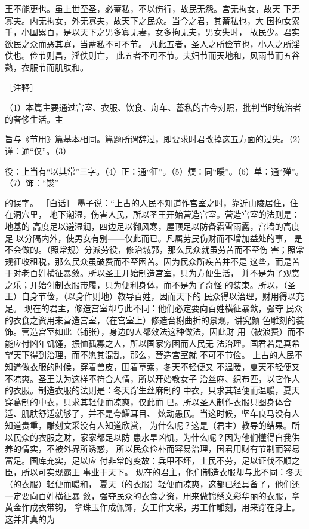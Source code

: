 \documentclass[12pt,UTF8]{ctexbook}
\begin{document}
王不能更也。虽上世至圣，必蓄私，不以伤行，故民无怨。宫无拘女，故天 
下无寡夫。内无拘女，外无寡夫，故天下之民众。当今之君，其蓄私也，大 
国拘女累千，小国累百，是以天下之男多寡无妻，女多拘无夫，男女失时， 
故民少。君实欲民之众而恶其寡，当蓄私不可不节。 
凡此五者，圣人之所俭节也，小人之所淫佚也。俭节则昌，淫佚则亡， 
此五者不可不节。夫妇节而天地和，风雨节而五谷熟，衣服节而肌肤和。 


［注释］ 

（1）本篇主要通过宫室、衣服、饮食、舟车、蓄私的古今对照，批判当时统治者的奢侈生活。主 

旨与《节用》篇基本相同。篇题所谓辞过，即要求时君改掉这五方面的过失。（2）谨：通“仅”。（3） 

役：上当有“以其常”三字。（4）正：通“征”。（5）煗：同“暖”。（6）单：通“殚”。（7）饰：“馂” 

的误字。 
［白话］ 
墨子说：“上古的人民不知道作宫室之时，靠近山陵居住，住在洞穴里， 
地下潮湿，伤害人民，所以圣王开始营造宫室。营造宫室的法则是：地基的 
高度足以避湿润，四边足以御风寒，屋顶足以防备霜雪雨露，宫墙的高度足 
以分隔内外，使男女有别——仅此而已。凡属劳民伤财而不增加益处的事， 
是不会做的。（照常规）分派劳役，修治城郭，那么民众就虽劳苦而不至伤 
害；照常规征收租税，那么民众虽破费而不至困苦。因为民众所疾苦并不是 
这些，而是苦于对老百姓横征暴敛。所以圣王开始制造宫室，只为方便生活， 
并不是为了观赏之乐；开始创制衣服带履，只为便利身体，而不是为了奇怪 
的装束。所以，（圣王）自身节俭，（以身作则地）教导百姓，因而天下的 
民众得以治理，财用得以充足。 
现在的君主，修造宫室却与此不同：他们必定要向百姓横征暴敛，强夺 
民众的衣食之资用来营造宫室，（在宫室上）修造台榭曲折的景观，讲究颜 
色雕刻的装饰。营造宫室如此（铺张），身边的人都效法这种做法，因此财 
用（被浪费）而不能应付凶年饥馑，振恤孤寡之人，所以国家穷困而人民无 
法治理。国君若是真希望天下得到治理，而不愿其混乱，那么，营造宫室就 
不可不节俭。 
上古的人民不知道做衣服的时候，穿着兽皮，围着草索，冬天不轻便又 
不温暖，夏天不轻便又不凉爽。圣王认为这样不符合人情，所以开始教女子 
治丝麻、织布匹，以它作人的衣服。制造衣服的法则是：冬天穿生丝麻制的 
中衣，只求其轻便而温暖，夏天穿葛制的中衣，只求其轻便而凉爽，仅此而 
已。所以圣人制作衣服只图身体合适、肌肤舒适就够了，并不是夸耀耳目、 
炫动愚民。当这时候，坚车良马没有人知道贵重，雕刻文采没有人知道欣赏， 
为什么呢？这是（君主）教导的结果。所以民众的衣服之财，家家都足以防 
患水旱凶饥，为什么呢？因为他们懂得自我供养的情实，不被外界所诱惑， 
所以民众俭朴而容易治理，国君用财有节制而容易富足。国库充实，足以应 
付非常的变故：兵甲不坏，士民不劳，足以证伐不顺之臣，所以可实现霸王 
事业于天下。 
现在的君主，他们制造衣服却与此不同：冬天（的衣服）轻便而暖和， 
夏天（的衣服）轻便而凉爽，这都已经具备了，他们还一定要向百姓横征暴 
敛，强夺民众的衣食之资，用来做锦绣文彩华丽的衣服，拿黄金作成衣带钩， 
拿珠玉作成佩饰，女工作文采，男工作雕刻，用来穿在身上。这并非真的为 
\end{document}
